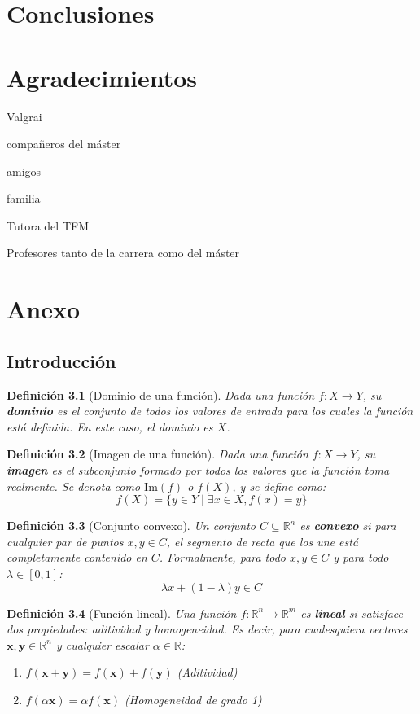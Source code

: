 \documentclass[12pt,a4paper]{book}
\newtheorem{defi}{Definición}[section]
\begin{document}
\chapter{Conclusiones}


\chapter{Agradecimientos}
Valgrai

compañeros del máster

amigos

familia

Tutora del TFM

Profesores tanto de la carrera como del máster 

\chapter{Anexo}
\section{Introducción}
\begin{defi}[Dominio de una función]
Dada una función $f: X \to Y$, su \textbf{dominio} es el conjunto de todos los valores de entrada para los cuales la función está definida. En este caso, el dominio es $X$.
\end{defi}

\begin{defi}[Imagen de una función]
Dada una función $f: X \to Y$, su \textbf{imagen} es el subconjunto formado por todos los valores que la función toma realmente. Se denota como $\text{Im}(f)$ o $f(X)$, y se define como:
$$ f(X) = \{y \in Y \mid \exists x \in X, f(x) = y \} $$
\end{defi}

\begin{defi}[Conjunto convexo]
Un conjunto $C \subseteq \mathbb{R}^n$ es \textbf{convexo} si para cualquier par de puntos $x, y \in C$, el segmento de recta que los une está completamente contenido en $C$. Formalmente, para todo $x, y \in C$ y para todo $\lambda \in [0, 1]$:
$$ \lambda x + (1-\lambda)y \in C $$
\end{defi}

\begin{defi}[Función lineal]
Una función $f: \mathbb{R}^n \to \mathbb{R}^m$ es \textbf{lineal} si satisface dos propiedades: aditividad y homogeneidad. Es decir, para cualesquiera vectores $\mathbf{x}, \mathbf{y} \in \mathbb{R}^n$ y cualquier escalar $\alpha \in \mathbb{R}$:
\begin{enumerate}
    \item $f(\mathbf{x}+\mathbf{y}) = f(\mathbf{x}) + f(\mathbf{y})$ (Aditividad)
    \item $f(\alpha \mathbf{x}) = \alpha f(\mathbf{x})$ (Homogeneidad de grado 1)
\end{enumerate}
\end{defi}
\end{document}
